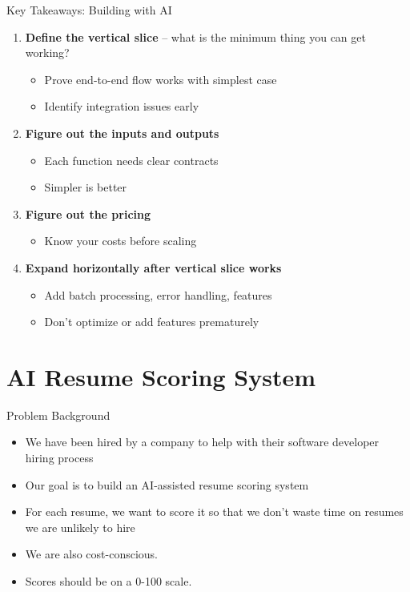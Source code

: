 \documentclass[aspectratio=169]{beamer}
\begin{document}
\begin{frame}{Key Takeaways: Building with AI}
\begin{enumerate}
\item \textbf{Define the vertical slice} -- what is the minimum thing you can get working?
    \begin{itemize}
        \item Prove end-to-end flow works with simplest case
        \item Identify integration issues early
    \end{itemize}

\item \textbf{Figure out the inputs and outputs}
    \begin{itemize}
        \item Each function needs clear contracts
        \item Simpler is better
    \end{itemize}

\item \textbf{Figure out the pricing}
    \begin{itemize}
        \item Know your costs before scaling
    \end{itemize}

\item \textbf{Expand horizontally after vertical slice works}
    \begin{itemize}
        \item Add batch processing, error handling, features
        \item Don't optimize or add features prematurely
    \end{itemize}

\end{enumerate}
\end{frame}


\section{AI Resume Scoring System}

\begin{frame}{Problem Background}
\begin{itemize}
  \item We have been hired by a company to help with their software developer hiring process
  \item Our goal is to build an AI-assisted resume scoring system
  \item For each resume, we want to score it so that we don't waste time on resumes we are unlikely to hire
  \item We are also cost-conscious.
  \item Scores should be on a 0-100 scale.
\end{itemize}
\end{frame}
\end{document}
